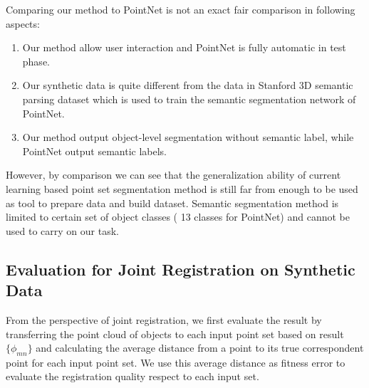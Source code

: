 %
Comparing our method to PointNet is not an exact fair comparison in following aspects:
\begin{enumerate}
\item Our method allow user interaction and PointNet is fully automatic in test phase.
\item Our synthetic data is quite different from the data in Stanford 3D semantic parsing dataset\cite{semsegdataset} which is used to train the semantic segmentation network of PointNet.
\item Our method output object-level segmentation without semantic label, while PointNet output semantic labels.  
\end{enumerate}
However, by comparison we can see that the generalization ability of current learning based point set segmentation method is still far from enough to be used as tool to prepare data and build dataset. Semantic segmentation method is limited to certain set of object classes ( 13 classes for PointNet) and cannot be used to carry on our task. 
\subsection{Evaluation for Joint Registration on Synthetic Data}
From the perspective of joint registration, we first evaluate the result by transferring the point cloud of objects to each input point set based on result $\{\phi_{mn}\}$ and calculating the average distance from a point to its true correspondent point for each input point set.
We use this average distance as fitness error to evaluate the registration quality respect to each input set.

